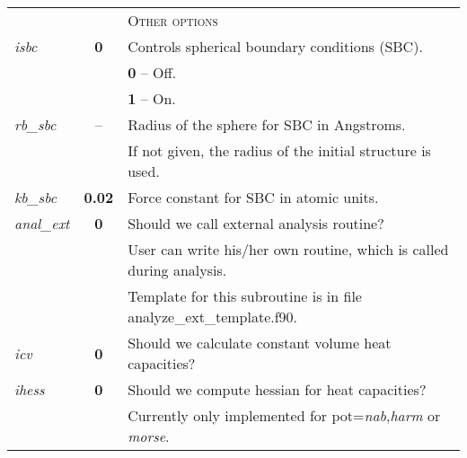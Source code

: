 \begin{tabularx}{\textwidth}{lcX}

& & \textsc{Other options} \\
\textit{isbc }&\textbf{0} & Controls spherical boundary conditions (SBC).\\
& & \textbf{0} -- Off.\\
& & \textbf{1} -- On.\\
\textit{rb\_sbc} & -- & Radius of the sphere for SBC in Angstroms.\\
& &  If not given, the radius of the initial structure is used. \\
\textit{kb\_sbc} & \textbf{0.02} &  Force constant for SBC in atomic units. \\

\colorbox{black!20}{\textit{anal\_ext}} & \textbf{0} & Should we call external analysis routine? \\
 & &User can write his/her own routine, which is called during analysis.\\
 & &  Template for this subroutine is in file analyze\_ext\_template.f90. \\

\colorbox{black!20}{\textit{icv}}  & \textbf{0} &	 Should we calculate constant volume heat capacities? \\
\colorbox{black!20}{\textit{ihess}}& \textbf{0} &  Should we compute hessian for heat capacities? \\
& &  Currently only implemented for pot=\textit{nab},\textit{harm} or \textit{morse}.   \\
\end{tabularx} 


